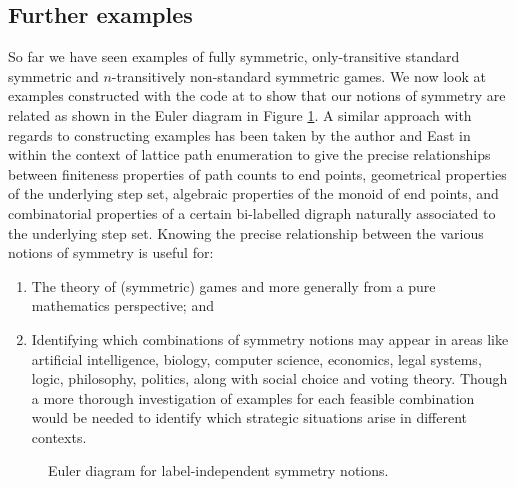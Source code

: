 \subsection{Further examples} \label{subsec:examples}
So far we have seen examples of fully symmetric, only-transitive standard symmetric and $n$-transitively non-standard symmetric games. We now look at examples constructed with the code at \cite{GLCode} to show that our notions of symmetry are related as shown in the Euler diagram in Figure \ref{fig:Eulerdiag}. A similar approach with regards to constructing examples has been taken by the author and East in \cite{EastHam} within the context of lattice path enumeration to give the precise relationships between finiteness properties of path counts to end points, geometrical properties of the underlying step set, algebraic properties of the monoid of end points, and combinatorial properties of a certain bi-labelled digraph naturally associated to the underlying step set. Knowing the precise relationship between the various notions of symmetry is useful for:
\begin{enumerate}
	\item The theory of (symmetric) games and more generally from a pure mathematics perspective; and
	\item Identifying which combinations of symmetry notions may appear in areas like artificial intelligence, biology, computer science, economics, legal systems, logic, philosophy, politics, along with social choice and voting theory. Though a more thorough investigation of examples for each feasible combination would be needed to identify which strategic situations arise in different contexts. 
\end{enumerate}

\begin{figure}[!ht]
	\begin{center}
	\end{center}
	\vspace{-0.5cm}
	\caption{Euler diagram for label-independent symmetry notions.}
	\label{fig:Eulerdiag}
\end{figure}

